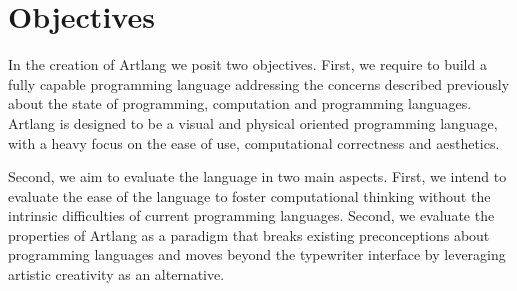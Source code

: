 \section{Objectives}
\label{sec:objectives}
In the creation of Artlang we posit two objectives.
First, we require to build a fully capable programming language addressing the concerns described previously about the state of programming, computation and programming languages.
Artlang is designed to be a visual and physical oriented programming language, with a heavy focus on the ease of use, computational correctness and aesthetics.

Second, we aim to evaluate the language in two main aspects.
First, we intend to evaluate the ease of the language to foster computational thinking without the intrinsic difficulties of current programming languages.
Second, we evaluate the properties of Artlang as a paradigm that breaks existing preconceptions about programming languages and moves beyond 
the typewriter interface by leveraging artistic creativity as an alternative.
\endinput